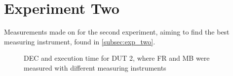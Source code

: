 \section{Experiment Two}\label{app:exp_two}

Measurements made on for the second experiment, aiming to find the best measuring instrument, found in \cref{subsec:exp_two}.

\begin{figure}[H]
    \centering
    \begin{subfigure}[b]{0.4\textwidth}
        \centering
        
    \end{subfigure}
    \hfill
    \begin{subfigure}[b]{0.4\textwidth}
        \centering
        
    \end{subfigure}
    \caption{DEC and execution time for DUT 2, where FR and MB were measured with different measuring instruments}
\end{figure}





% 
% 

% 
% 
% 

% 
% 

